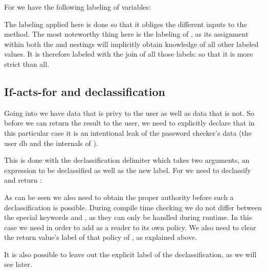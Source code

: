For  we have the following labeling of variables:\\
\begin{minipage}{\linewidth}

\end{minipage}

The labeling applied here is done so that it obliges the different inputs to the method.
The most noteworthy thing here is the labeling of , as its assignment within both the  and  nestings will implicitly obtain knowledge of all other labeled values.
It is therefore labeled with the join of all those labels:  so that it is more strict than all.

\subsection{If-acts-for and declassification}
Going into  we have data that is privy to the user as well as data that is not.
So before we can return the result to the user, we need to explicitly declare that in this particular case it is an intentional leak of the password checker's data (the user db and the internals of ).

This is done with the declassification delimiter \dlmc{<| |>} which takes two arguments, an expression to be declassified as well as the new label.
For  we need to declassify and return :\\
\begin{minipage}{\linewidth}

\end{minipage}

As can be seen we also need to obtain the proper authority before such a declassification is possible.
During compile time checking we do not differ between the special keywords  and , as they can only be handled during runtime.
In this case we need  in order to add  as a reader to its own policy.
We also need to clear the return value's label of that policy of , as explained above.

It is also possible to leave out the explicit label of the declassification, as we will see later.

